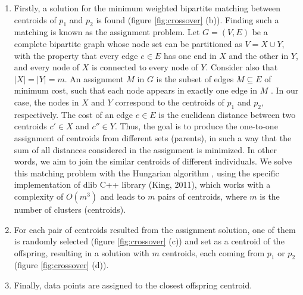 \begin{enumerate}

	\item Firstly, a solution for the minimum weighted bipartite matching between centroids of $p_1$ and $p_2$ is found (figure \ref{fig:crossover} (b)). Finding such a matching is known as the assignment problem. Let $G = (V, E)$ be a complete bipartite graph whose node set can be partitioned as $V = X \cup Y$, with the property that every edge $e \in E$ has one end in $X$ and the other in $Y$, and every node of $X$ is connected to every node of $Y$. Consider also that $|X| = |Y| = m$. An assignment $M$ in $G$ is the subset of edges $M \subseteq E$ of minimum cost, such that each node appears in exactly one edge in $M$ \cite{tardos}. In our case, the nodes in $X$ and $Y$ correspond to the centroids of $p_1$ and $p_2$, respectively. The cost of an edge $e \in E$ is the euclidean distance between two centroids $c' \in X$ and $c'' \in Y$. Thus, the goal is to produce the one-to-one assignment of centroids from different sets (parents), in such a way that the sum of all distances considered in the assignment is minimized. In other words, we aim to join the similar centroids of different individuals. We solve this matching problem with the Hungarian algorithm \cite{Kuhn1955}, using the specific implementation of dlib C++ library (King, 2011), which works with a complexity of $O(m^3)$ and leads to $m$ pairs of centroids, where $m$ is the number of clusters (centroids).


	\item For each pair of centroids resulted from the assignment solution, one of them is randomly selected (figure \ref{fig:crossover} (c)) and set as a centroid of the offspring, resulting in a solution with $m$ centroids, each coming from $p_1$ or $p_2$ (figure \ref{fig:crossover} (d)).

	\item Finally, data points are assigned to the closest offspring centroid.
\end{enumerate}

